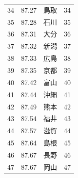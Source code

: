 \begin{table}[ht]
\begin{tabular}{rrlr}
  34 & 87.27 & 鳥取 &  34 \\ 
  35 & 87.28 & 石川 &  35 \\ 
  36 & 87.31 & 大分 &  36 \\ 
  37 & 87.32 & 新潟 &  37 \\ 
  38 & 87.33 & 広島 &  38 \\ 
  39 & 87.35 & 京都 &  39 \\ 
  40 & 87.42 & 富山 &  40 \\ 
  41 & 87.44 & 沖縄 &  41 \\ 
  42 & 87.49 & 熊本 &  42 \\ 
  43 & 87.54 & 福井 &  43 \\ 
  44 & 87.57 & 滋賀 &  44 \\ 
  45 & 87.64 & 島根 &  45 \\ 
  46 & 87.67 & 長野 &  46 \\ 
  47 & 87.67 & 岡山 &  47 \\ 
   \hline
\end{tabular}
\end{table}






